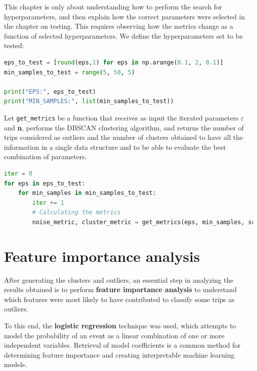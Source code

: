This chapter is only about understanding how to perform the search for hyperparameters, and then explain how the correct parameters were selected in the chapter on testing.
This requires observing how the metrics change as a function of selected hyperparameters. We define the hyperparameters set to be tested:

\begin{minipage}{\linewidth}
\begin{lstlisting}[language=Python]
eps_to_test = [round(eps,1) for eps in np.arange(0.1, 2, 0.1)]
min_samples_to_test = range(5, 50, 5)

print("EPS:", eps_to_test)
print("MIN_SAMPLES:", list(min_samples_to_test))
\end{lstlisting}
\end{minipage}

Let \verb|get_metrics| be a function that receives as input the iterated parameters $\varepsilon$ and \textbf{n}, performs the DBSCAN clustering algorithm, and returns the number of trips considered as outliers and the number of clusters obtained to have all the information in a single data structure and to be able to evaluate the best combination of parameters.

\begin{minipage}{\linewidth}
\begin{lstlisting}[language=Python]
iter = 0
for eps in eps_to_test:
    for min_samples in min_samples_to_test:
        iter += 1
        # Calculating the metrics
        noise_metric, cluster_metric = get_metrics(eps, min_samples, scaled_df, iter)
\end{lstlisting}
\end{minipage}

\section{Feature importance analysis}
\label{sec:importance}

After generating the clusters and outliers, an essential step in analyzing the results obtained is to perform \textbf{feature importance analysis} to understand which features were most likely to have contributed to classify some trips as outliers.

To this end, the \textbf{logistic regression} technique was used, which attempts to model the probability of an event as a linear combination of one or more independent variables. Retrieval of model coefficients is a common method for determining feature importance and creating interpretable machine learning models.


